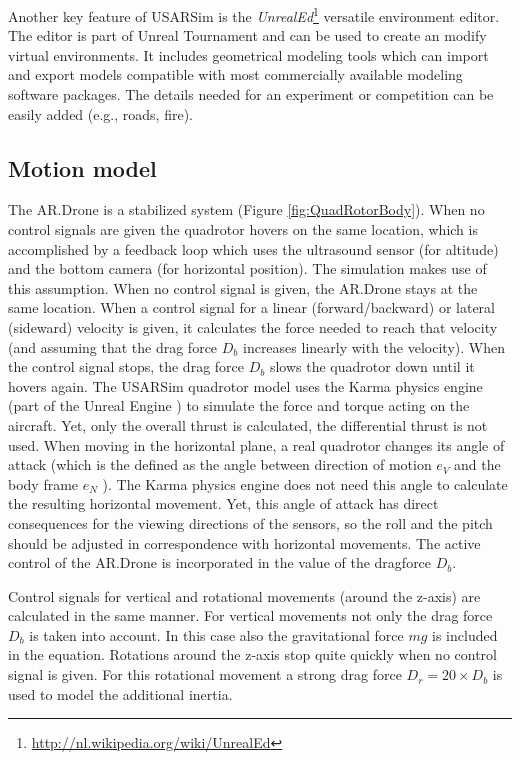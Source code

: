 Another key feature of USARSim is the \textit{UnrealEd}\footnote{\url{http://nl.wikipedia.org/wiki/UnrealEd}} versatile environment editor.
The editor is part of Unreal Tournament and can be used to create an modify virtual environments.
It includes geometrical modeling tools which can import and export models compatible with most commercially available modeling software packages.
The details needed for an experiment or competition can be easily added (e.g., roads, fire).



		\subsection{Motion model}
The AR.Drone is a stabilized system (Figure \ref{fig:QuadRotorBody}). When no control signals are given the quadrotor hovers on the same location, which is accomplished by a feedback loop which uses the ultrasound sensor (for altitude) and the bottom camera (for horizontal position). The simulation makes use of this assumption. When no control signal is given, the AR.Drone stays at the same location.
When a control signal for a linear (forward/backward) or lateral (sideward) velocity is given, it calculates the force needed to reach that velocity (and assuming that the drag force $D_b$ increases linearly with the velocity). When the control signal stops, the drag force $D_b$ slows the quadrotor down until it hovers again.
The USARSim quadrotor model uses the Karma physics engine (part of the Unreal Engine \cite{Carpin2006}) to simulate the force and torque acting on the aircraft. Yet, only the overall thrust is calculated, the differential thrust is not used.
When moving in the horizontal plane, a real quadrotor changes its angle of attack (which is the defined as the angle between direction of motion $e_V$ and the body frame $e_N$ \cite{Yechout2003}). 
The Karma physics engine does not need this angle to calculate the resulting horizontal movement. Yet, this angle of attack has direct consequences for the viewing directions of the sensors, so the roll and the pitch should be adjusted in correspondence with horizontal movements. The active control of the AR.Drone is incorporated in the value of the dragforce $D_b$.

Control signals for vertical and rotational movements (around the z-axis) are calculated in the same manner. For vertical movements not only the drag force $D_b$ is taken into account. In this case also the gravitational force $mg$ is included in the equation. Rotations around the z-axis stop quite quickly when no control signal is given. For this rotational movement a strong drag force $D_r = 20 \times D_b$ is used to model the additional inertia. 

